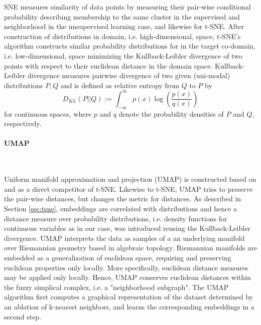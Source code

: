 \documentclass[]{article}
\renewcommand{\cite}{\citep}
\begin{document}
SNE measures similarity of data points by measuring their pair-wise conditional probability describing membership to the same cluster in the supervised and neighborhood in the unsupervised learning case, and likewise for t-SNE. After construction of distributions in domain, i.e. high-dimensional, space, t-SNE's algorithm constructs similar probability distributions for in the target co-domain, i.e. low-dimensional, space minimizing the Kullback-Leibler divergence \cite{hershey2007approximating} of two points with respect to their euclidean distance in the domain space. Kullback-Leibler divergence measures pairwise divergence of two given (uni-modal) distributions $P,Q$ and is defined as relative entropy from $Q$ to $P$ by
\begin{equation}
	\label{equ:KL_div}
	D_{KL} (P||Q) := \int_{-\infty}^\infty p(x)\log \left(\frac{p(x)}{q(x)}\right)
\end{equation}
for continuous spaces, where $p$ and $q$ denote the probability densities of $P$ and $Q$, respectively.

\paragraph{UMAP}\mbox{}\\
\label{sec:umap}

Uniform manifold approximation and projection (UMAP) \cite{mcinnes2018umap} is constructed based on and as a direct competitor of t-SNE. Likewise to t-SNE, UMAP tries to preserve the pair-wise distances, but changes the metric for distances. As described in Section \ref{sec:tsne}, embeddings are correlated with distributions and hence a distance measure over probability distributions, i.e. density functions for continuous variables as in our case, was introduced reusing the Kullback-Leibler divergence. UMAP interprets the data as samples of a an underlying manifold over Riemannian geometry based in algebraic topology. Riemannian manifolds are embedded as a generalization of euclidean space, requiring and preserving euclidean properties only locally. More specifically, euclidean distance measures may be applied only locally. Hence, UMAP conserves euclidean distances within the fuzzy simplical complex, i.e. a "neighborhood subgraph".
The UMAP algorithm first computes a graphical representation of the dataset determined by an ablation of k-nearest neighbors, and learns the corresponding embeddings in a second step. \\
\end{document}
